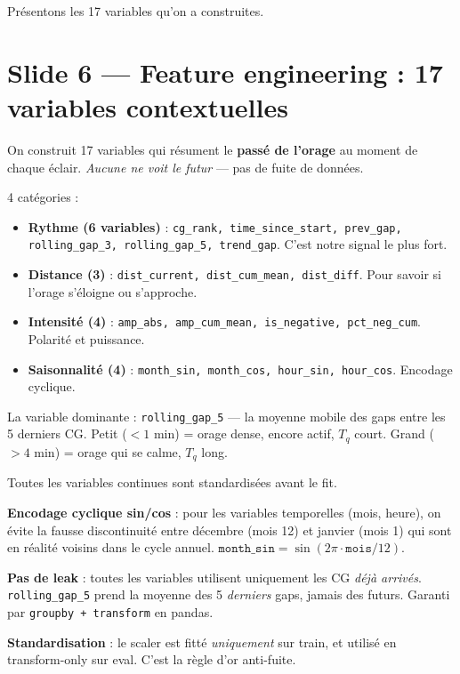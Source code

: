 \documentclass[11pt,a4paper]{article}
\begin{document}
\begin{transit}
\og Présentons les 17 variables qu'on a construites. \fg{}
\end{transit}

\section{Slide 6 — Feature engineering : 17 variables contextuelles}

\begin{dire}
\og On construit 17 variables qui résument le \textbf{passé de l'orage} au moment de chaque
éclair. \emph{Aucune ne voit le futur} — pas de fuite de données.

4 catégories :
\begin{itemize}
    \item \textbf{Rythme (6 variables)} : \texttt{cg\_rank, time\_since\_start, prev\_gap,
    rolling\_gap\_3, rolling\_gap\_5, trend\_gap}. C'est notre signal le plus fort.
    \item \textbf{Distance (3)} : \texttt{dist\_current, dist\_cum\_mean, dist\_diff}. Pour
    savoir si l'orage s'éloigne ou s'approche.
    \item \textbf{Intensité (4)} : \texttt{amp\_abs, amp\_cum\_mean, is\_negative,
    pct\_neg\_cum}. Polarité et puissance.
    \item \textbf{Saisonnalité (4)} : \texttt{month\_sin, month\_cos, hour\_sin, hour\_cos}.
    Encodage cyclique.
\end{itemize}

La variable dominante : \texttt{rolling\_gap\_5} — la moyenne mobile des gaps entre les 5
derniers CG. Petit ($<1$ min) = orage dense, encore actif, $T_q$ court. Grand ($>4$ min) =
orage qui se calme, $T_q$ long.

Toutes les variables continues sont standardisées avant le fit. \fg{}
\end{dire}

\begin{compr}
\textbf{Encodage cyclique sin/cos} : pour les variables temporelles (mois, heure), on évite
la fausse discontinuité entre décembre (mois 12) et janvier (mois 1) qui sont en réalité
voisins dans le cycle annuel. $\texttt{month\_sin} = \sin(2\pi \cdot \texttt{mois}/12)$.

\textbf{Pas de leak} : toutes les variables utilisent uniquement les CG \emph{déjà arrivés}.
\texttt{rolling\_gap\_5} prend la moyenne des 5 \emph{derniers} gaps, jamais des futurs.
Garanti par \texttt{groupby + transform} en pandas.

\textbf{Standardisation} : le scaler est fitté \emph{uniquement} sur train, et utilisé en
\og transform-only \fg{} sur eval. C'est la règle d'or anti-fuite.
\end{compr}
\end{document}
